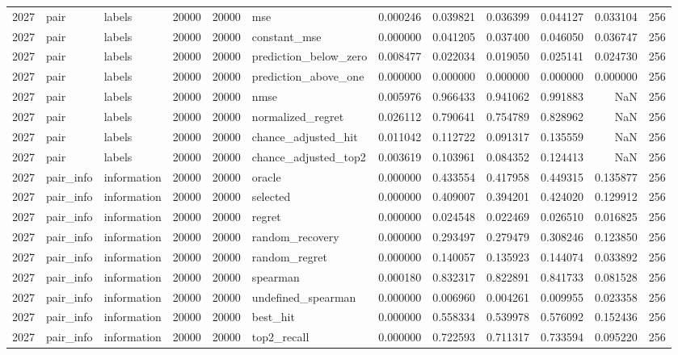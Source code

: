 \begin{tabular}{rllrrlrrrrrr}
2027 & pair & labels & 20000 & 20000 & mse & 0.000246 & 0.039821 & 0.036399 & 0.044127 & 0.033104 & 256 \\
2027 & pair & labels & 20000 & 20000 & constant_mse & 0.000000 & 0.041205 & 0.037400 & 0.046050 & 0.036747 & 256 \\
2027 & pair & labels & 20000 & 20000 & prediction_below_zero & 0.008477 & 0.022034 & 0.019050 & 0.025141 & 0.024730 & 256 \\
2027 & pair & labels & 20000 & 20000 & prediction_above_one & 0.000000 & 0.000000 & 0.000000 & 0.000000 & 0.000000 & 256 \\
2027 & pair & labels & 20000 & 20000 & nmse & 0.005976 & 0.966433 & 0.941062 & 0.991883 & NaN & 256 \\
2027 & pair & labels & 20000 & 20000 & normalized_regret & 0.026112 & 0.790641 & 0.754789 & 0.828962 & NaN & 256 \\
2027 & pair & labels & 20000 & 20000 & chance_adjusted_hit & 0.011042 & 0.112722 & 0.091317 & 0.135559 & NaN & 256 \\
2027 & pair & labels & 20000 & 20000 & chance_adjusted_top2 & 0.003619 & 0.103961 & 0.084352 & 0.124413 & NaN & 256 \\
2027 & pair_info & information & 20000 & 20000 & oracle & 0.000000 & 0.433554 & 0.417958 & 0.449315 & 0.135877 & 256 \\
2027 & pair_info & information & 20000 & 20000 & selected & 0.000000 & 0.409007 & 0.394201 & 0.424020 & 0.129912 & 256 \\
2027 & pair_info & information & 20000 & 20000 & regret & 0.000000 & 0.024548 & 0.022469 & 0.026510 & 0.016825 & 256 \\
2027 & pair_info & information & 20000 & 20000 & random_recovery & 0.000000 & 0.293497 & 0.279479 & 0.308246 & 0.123850 & 256 \\
2027 & pair_info & information & 20000 & 20000 & random_regret & 0.000000 & 0.140057 & 0.135923 & 0.144074 & 0.033892 & 256 \\
2027 & pair_info & information & 20000 & 20000 & spearman & 0.000180 & 0.832317 & 0.822891 & 0.841733 & 0.081528 & 256 \\
2027 & pair_info & information & 20000 & 20000 & undefined_spearman & 0.000000 & 0.006960 & 0.004261 & 0.009955 & 0.023358 & 256 \\
2027 & pair_info & information & 20000 & 20000 & best_hit & 0.000000 & 0.558334 & 0.539978 & 0.576092 & 0.152436 & 256 \\
2027 & pair_info & information & 20000 & 20000 & top2_recall & 0.000000 & 0.722593 & 0.711317 & 0.733594 & 0.095220 & 256 \\

\end{tabular}

